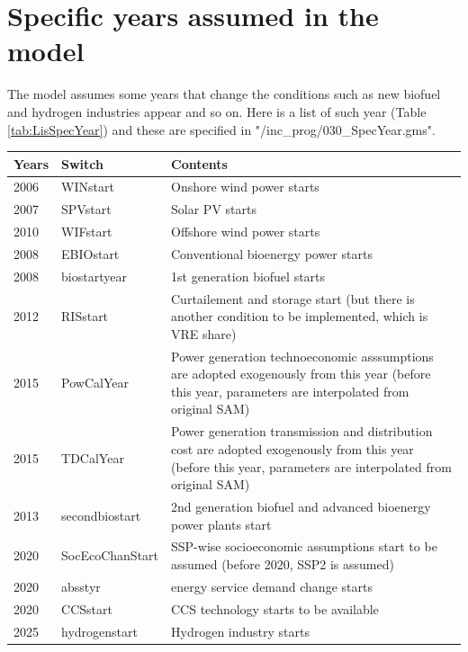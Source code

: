 \documentclass[10pt,a4paper,titlepage,dvipdfmx]{book}
\begin{document}
\section{\label{sec:SpecYearAssum}Specific years assumed in the model}

The model assumes some years that change the conditions such as new biofuel and hydrogen industries appear and so on.
Here is a list of such year (Table \ref{tab:LisSpecYear}) and these are specified in "/inc\_prog/030\_SpecYear.gms".

\begin{tabularx}{\textwidth}{|
p{}|
p{}|
p{}|} 
\caption{\label{tab:LisSpecYear} List of specific assumptions years} \\
\hline 
Years & Switch & Contents \\\hline 
2006 & WINstart & Onshore wind power starts \\\hline 
2007 & SPVstart & Solar PV starts \\\hline 
2010 & WIFstart & Offshore wind power starts \\\hline 
2008 & EBIOstart & Conventional bioenergy power starts \\\hline 
2008 & biostartyear & 1st generation biofuel starts \\\hline 
2012 & RISstart & Curtailement and storage start (but there is another condition to be implemented, which is VRE share) \\\hline 
2015 & PowCalYear & Power generation technoeconomic asssumptions are adopted exogenously from this year (before this year, parameters are interpolated from original SAM) \\\hline
2015 & TDCalYear & Power generation transmission and distribution cost are adopted exogenously from this year (before this year, parameters are interpolated from original SAM)  \\\hline 
2013 & secondbiostart & 2nd generation biofuel and advanced bioenergy power plants start \\\hline 
2020 & SocEcoChanStart & SSP-wise socioeconomic assumptions start to be assumed (before 2020, SSP2 is assumed) \\\hline 
2020 & absstyr & energy service demand change starts \\\hline 
2020 & CCSstart & CCS technology starts to be available \\\hline 
2025 & hydrogenstart & Hydrogen industry starts \\\hline 

\end{tabularx}
\end{document}
